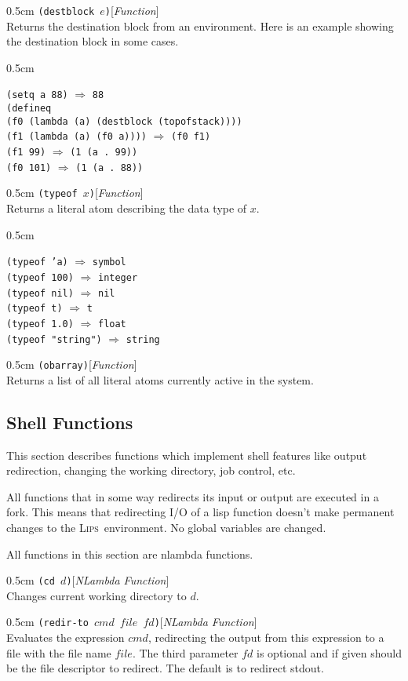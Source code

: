 \documentclass[a4paper]{article}
\newcommand{\lips}{\textsc{Lips}}
\newcommand{\lisp}[1]{\texttt{#1}}
\newenvironment{examples}{
  \newcommand{\ex}[2]{
    \lisp{##1} $\Rightarrow$ \lisp{##2}\\
  }
  \begin{adjustwidth}{0.5cm}{}}{\end{adjustwidth}}
\newenvironment{defun}[2]{\begin{adjustwidth}{0.5cm}{}
    {\hspace*{-0.5cm}\lisp{#2}\hfill[\textit{#1}]\\}}
               {\end{adjustwidth}}
\begin{document}
\begin{defun}{Function}{(destblock $e$)}
  Returns the destination block from an environment. Here is an
  example showing the destination block in some cases.
  \begin{examples}
    \ex{(setq a 88)}{88}
    \ex{(defineq\\
      \hspace*{3mm}(f0 (lambda (a) (destblock (topofstack))))\\
      \hspace*{3mm}(f1 (lambda (a) (f0 a))))}{(f0 f1)}
    \ex{(f1 99)}{(1 (a . 99))}
    \ex{(f0 101)}{(1 (a . 88))}
  \end{examples}
\end{defun}


\begin{defun}{Function}{(typeof $x$)}
  Returns a literal atom describing the data type of $x$.

  \begin{examples}
    \ex{(typeof 'a)}{symbol}
    \ex{(typeof 100)}{integer}
    \ex{(typeof nil)}{nil}
    \ex{(typeof t)}{t}
    \ex{(typeof 1.0)}{float}
    \ex{(typeof "string")}{string}
  \end{examples}

\end{defun}

\begin{defun}{Function}{(obarray)}
  Returns a list of all literal atoms
  currently active in the system.
\end{defun}

\subsection{Shell Functions}
This section describes functions which implement shell features like
output redirection, changing the working directory, job control, etc.

All functions that in some way redirects its input or output are
executed in a fork.  This means that redirecting I/O of a lisp
function doesn't make permanent changes to the \lips\ environment.  No
global variables are changed.

All functions in this section are nlambda functions.

\begin{defun}{NLambda Function}{(cd $d$)}
  Changes current working directory to $d$.
\end{defun}


\begin{defun}{NLambda Function}{(redir-to $cmd$ $file$ $fd$)}
  Evaluates the expression $cmd$, redirecting the output from this
  expression to a file with the file name $file$. The third parameter
  $fd$ is optional and if given should be the file descriptor to
  redirect. The default is to redirect stdout.
\end{defun}
\end{document}
